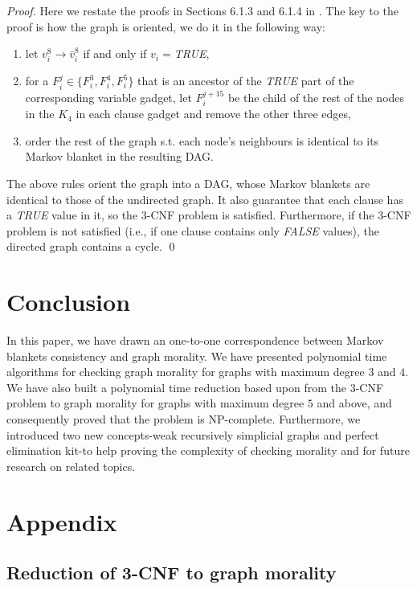 \begin{proof}
Here we restate the proofs in Sections 6.1.3 and 6.1.4 in \cite{verma1993deciding}. The key to the proof is how the graph is oriented, we do it in the following way: 
\begin{enumerate}
    \item let $v_i^8 \rightarrow \bar{v}_i^8$ if and only if $v_i=$\textit{TRUE},
    \item for a $F_i^j \in \{F_i^{3},F_i^{4},F_i^{5}\}$ that is an ancestor of the \textit{TRUE} part of the corresponding variable gadget, let $F_i^{j+15}$ be the child of the rest of the nodes in the $K_4$ in each clause gadget and remove the other three edges, 
    \item order the rest of the graph s.t. each node's neighbours is identical to its Markov blanket in the resulting DAG. 
\end{enumerate}
The above rules orient the graph into a DAG, whose Markov blankets are identical to those of the undirected graph. It also guarantee that each clause has a \textit{TRUE} value in it, so the 3-CNF problem is satisfied. Furthermore, if the 3-CNF problem is not satisfied (i.e., if one clause contains only \textit{FALSE} values), the directed graph contains a cycle. \qed
\end{proof}


\section{Conclusion}
In this paper, we have drawn an one-to-one correspondence between Markov blankets consistency and graph morality. We have presented polynomial time algorithms for checking graph morality for graphs with maximum degree $3$ and $4$. We have also built a polynomial time reduction based upon \cite{verma1993deciding} from the 3-CNF problem to graph morality for graphs with maximum degree $5$ and above, and consequently proved that the problem is NP-complete. Furthermore, we introduced two new concepts-weak recursively simplicial graphs and perfect elimination kit-to help proving the complexity of checking morality and for future research on related topics. 

\newpage
\section{Appendix}
\subsection{Reduction of 3-CNF to graph morality}

